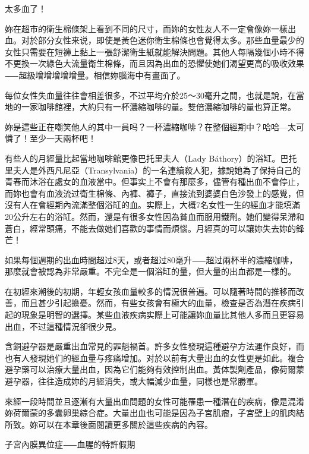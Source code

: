 \documentclass[12pt,UTF8]{ctexbook}
\begin{document}
太多血了！





妳在超市的衛生棉條架上看到不同的尺寸，而妳的女性友人不一定會像妳一樣出血。对於部分女性来说，即使是黃色迷你衛生棉條也會覺得太多。那些血量最少的女性只需要在短褲上黏上一張舒潔衛生紙就能解決問題。其他人每隔幾個小時不得不更換一次綠色大流量衛生棉條，而且因為出血的恐懼使她们渴望更高的吸收效果⸺超級增增增增增量。相信妳腦海中有畫面了。





每位女性失血量往往會相差很多，不过平均介於25〜30毫升之間，也就是說，在當地的一家咖啡館裡，大約只有一杯濃縮咖啡的量。雙倍濃縮咖啡的量也算正常。

妳是這些正在嘲笑他人的其中一員吗？一杯濃縮咖啡？在整個經期中？哈哈—太可憐了！至少一天兩杯吧！

有些人的月經量比起當地咖啡館更像巴托里夫人（Lady Báthory）的浴缸。巴托里夫人是外西凡尼亞（Transylvania）的一名連續殺人犯，據說她為了保持自己的青春而沐浴在處女的血液當中。但事实上不會有那麼多，儘管有種出血不會停止，而妳也會有血液流过衛生棉條、內褲、褲子，直接流到婆婆白色沙發上的感覺，但沒有人在會經期內流滿整個浴缸的血。实際上，大概7名女性一生的經血才能填滿20公升左右的浴缸。然而，還是有很多女性因為貧血而服用鐵劑。她们變得呆滯和蒼白，經常頭痛，不能去做她们喜歡的事情而煩惱。月經真的可以讓妳失去妳的鋒芒！

如果每個週期的出血時間超过8天，或者超过80毫升⸺超过兩杯半的濃縮咖啡，那麼就會被認為非常嚴重。不完全是一個浴缸的量，但大量的出血都是一樣的。

在初經來潮後的初期，年輕女孩血量較多的情況很普遍。可以隨著時間的推移而改善，而且甚少引起擔憂。然而，有些女孩會有極大的血量，檢查是否為潛在疾病引起的現象是明智的選擇。某些血液疾病实際上可能讓妳血量比其他人多而且更容易出血，不过這種情況卻很少見。

含銅避孕器是嚴重出血常見的罪魁禍首。許多女性發現這種避孕方法運作良好，而也有人發現她们的經血量与疼痛增加。对於以前有大量出血的女性更是如此。複合避孕藥可以治療大量出血，因為它们能夠有效控制出血。黃体製劑產品，像荷爾蒙避孕器，往往造成妳的月經消失，或大幅減少血量，同樣也是常勝軍。

來經一段時間並且逐漸有大量出血問題的女性可能罹患一種潛在的疾病，像是混淆妳荷爾蒙的多囊卵巢綜合症。大量出血也可能是因為子宮肌瘤，子宮壁上的肌肉結所致。妳可以在本章後面閱讀更多關於這些疾病的內容。





子宮內膜異位症⸺血腥的特許假期
\end{document}
